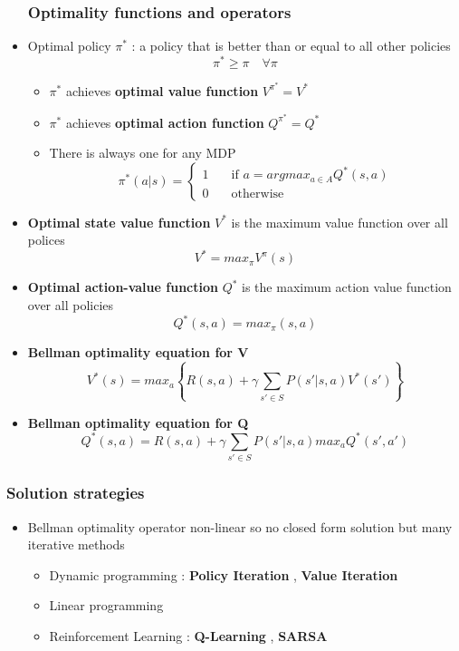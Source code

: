 \documentclass[12pt]{article} %
\begin{document}
\begin{itemize}
\subsubsection{Optimality functions and operators}

\item Optimal policy $\pi^{*}$ : a policy that is better than or equal to all other policies
$$ \pi^{*} \geq \pi \quad \forall \pi$$
\begin{itemize}
\item $\pi^{*}$ achieves \textbf{optimal value function} $V^{\pi^*}=V^*$
\item $\pi^{*}$ achieves \textbf{optimal action function} $Q^{\pi^*}=Q^*$
\item There is always one for any MDP
$$ \pi^*(a|s)= \begin{cases}
1 & \quad \text{if } a=argmax_{a \in A}Q^*(s,a)\\
0 & \quad \text{otherwise} 
\end{cases}$$
\end{itemize}
\item \textbf{Optimal state value function} $V^{*}$ is the maximum value function over all polices
$$ V^{*} = max_{\pi}V^{\pi}(s)$$

\item \textbf{Optimal action-value function} $Q^{*}$ is the maximum action value function over all policies
$$ Q^{*}(s,a)= max_{\pi}(s,a)$$


\item \textbf{Bellman optimality equation for V}
$$ V^{*}(s) = max_a\left\{  R(s,a) +\gamma \sum_{s' \in S}P(s'|s,a)V^*(s')  \right\}$$
\item \textbf{Bellman optimality equation for Q}
$$ Q^{*}(s,a) = R(s,a) +\gamma \sum_{s' \in S}P(s'|s,a)max_aQ^*(s',a')$$
\end{itemize}

\subsubsection{Solution strategies}
\begin{itemize}
\item Bellman optimality operator non-linear so no closed form solution but many iterative methods 
\begin{itemize}
\item Dynamic programming : \textbf{Policy Iteration} , \textbf{Value Iteration}
\item Linear programming 
\item Reinforcement Learning :	\textbf{Q-Learning} , \textbf{SARSA}
\end{itemize}
\end{itemize}
\end{document}
